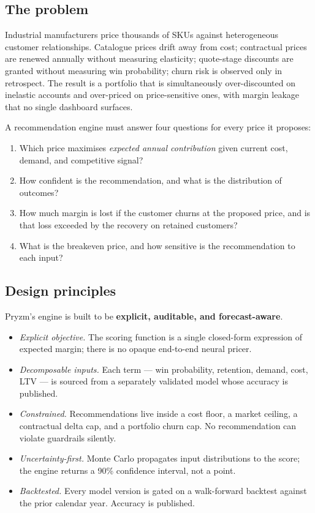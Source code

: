 \documentclass[11pt,a4paper]{article}
\begin{document}
\subsection{The problem}
Industrial manufacturers price thousands of SKUs against heterogeneous customer relationships. Catalogue prices drift away from cost; contractual prices are renewed annually without measuring elasticity; quote-stage discounts are granted without measuring win probability; churn risk is observed only in retrospect. The result is a portfolio that is simultaneously over-discounted on inelastic accounts and over-priced on price-sensitive ones, with margin leakage that no single dashboard surfaces.

A recommendation engine must answer four questions for every price it proposes:
\begin{enumerate}[leftmargin=2em,itemsep=2pt]
  \item Which price maximises \emph{expected annual contribution} given current cost, demand, and competitive signal?
  \item How confident is the recommendation, and what is the distribution of outcomes?
  \item How much margin is lost if the customer churns at the proposed price, and is that loss exceeded by the recovery on retained customers?
  \item What is the breakeven price, and how sensitive is the recommendation to each input?
\end{enumerate}

\subsection{Design principles}
Pryzm's engine is built to be \textbf{explicit, auditable, and forecast-aware}.
\begin{itemize}[leftmargin=2em,itemsep=2pt]
  \item \emph{Explicit objective.} The scoring function is a single closed-form expression of expected margin; there is no opaque end-to-end neural pricer.
  \item \emph{Decomposable inputs.} Each term --- win probability, retention, demand, cost, LTV --- is sourced from a separately validated model whose accuracy is published.
  \item \emph{Constrained.} Recommendations live inside a cost floor, a market ceiling, a contractual delta cap, and a portfolio churn cap. No recommendation can violate guardrails silently.
  \item \emph{Uncertainty-first.} Monte Carlo propagates input distributions to the score; the engine returns a 90\% confidence interval, not a point.
  \item \emph{Backtested.} Every model version is gated on a walk-forward backtest against the prior calendar year. Accuracy is published.
\end{itemize}
\end{document}
